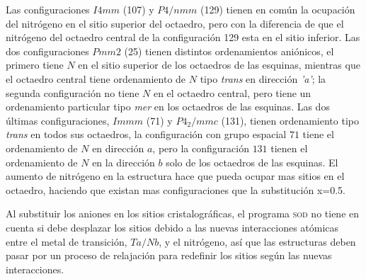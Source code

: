 Las configuraciones $I4mm$ (107) y $P4/nmm$ (129) tienen en común la ocupación del nitrógeno en el sitio superior del octaedro, pero con la diferencia de que el nitrógeno del octaedro central de la configuración 129 esta en el sitio inferior. Las dos configuraciones $Pmm2$ (25) tienen distintos ordenamientos aniónicos, el primero tiene $N$ en el sitio superior de los octaedros de las esquinas, mientras que el octaedro central tiene ordenamiento de $N$ tipo \emph{trans} en dirección \emph{'a'}; la segunda configuración no tiene $N$ en el octaedro central, pero tiene un ordenamiento particular tipo \emph{mer} en los octaedros de las esquinas. Las dos últimas configuraciones, $Immm$ (71) y $P4_{2}/mmc$ (131), tienen ordenamiento tipo \emph{trans} en todos sus octaedros, la configuración con grupo espacial $71$ tiene el ordenamiento de $N$ en dirección $a$, pero la configuración $131$ tienen el ordenamiento de $N$ en la dirección $b$ solo de los octaedros de las esquinas. El aumento de nitrógeno en la estructura hace que pueda ocupar mas sitios en el octaedro, haciendo que existan mas configuraciones que la substitución x=0.5.


Al substituir los aniones en los sitios cristalográficas, el programa \textsc{sod} no tiene en cuenta si debe desplazar los sitios debido a las nuevas interacciones atómicas entre el metal de transición, $Ta/Nb$, y el nitrógeno, así que las estructuras deben pasar por un proceso de relajación para redefinir los sitios según las nuevas interacciones.
